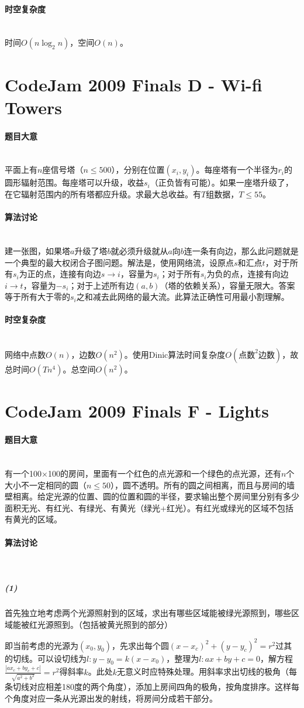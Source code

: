 \documentclass[UTF8]{ctexart}
\newcommand{\myparagraph}[1]{\paragraph{#1}\mbox{}\\}
\theoremstyle{nonumberplain}
\begin{document}
		\myparagraph{时空复杂度}
		
			时间$O(n\log_2n)$，空间$O(n)$。
	
	\section{CodeJam 2009 Finals D - Wi-fi Towers}
	
		\myparagraph{题目大意}
		
			平面上有$n$座信号塔（$n \leq 500$），分别在位置$(x_i,y_i)$。每座塔有一个半径为$r_i$的圆形辐射范围。每座塔可以升级，收益$s_i$（正负皆有可能）。如果一座塔升级了，在它辐射范围内的所有塔都应升级。求最大总收益。有$T$组数据，$T \leq 55$。
		
		\myparagraph{算法讨论}
		
			建一张图，如果塔$a$升级了塔$b$就必须升级就从$a$向$b$连一条有向边，那么此问题就是一个典型的最大权闭合子图问题。解法是，使用网络流，设原点$s$和汇点$t$，对于所有$s_i$为正的点，连接有向边$s \to i$，容量为$s_i$；对于所有$s_i$为负的点，连接有向边$i \to t$，容量为$-s_i$；对于上述所有边$(a,b)$（塔的依赖关系），容量无限大。答案等于所有大于零的$s_i$之和减去此网络的最大流。此算法正确性可用最小割理解。
		
		\myparagraph{时空复杂度}
		
			网络中点数$O(n)$，边数$O(n^2)$。使用Dinic算法时间复杂度$O(\mbox{点数}^2\mbox{边数})$，故总时间$O(Tn^4)$。总空间$O(n^2)$。
	
	\section{CodeJam 2009 Finals F - Lights}
	
		\myparagraph{题目大意}
		
			有一个100×100的房间，里面有一个红色的点光源和一个绿色的点光源，还有$n$个大小不一定相同的圆（$n \leq 50$），圆不透明。所有的圆之间相离，而且与房间的墙壁相离。给定光源的位置、圆的位置和圆的半径，要求输出整个房间里分别有多少面积无光、有红光、有绿光、有黄光（绿光+红光）。有红光或绿光的区域不包括有黄光的区域。
		
		\myparagraph{算法讨论}
		
			\subparagraph{(1)}
			首先独立地考虑两个光源照射到的区域，求出有哪些区域能被绿光源照到，哪些区域能被红光源照到。（包括被黄光照到的部分）
			
			即当前考虑的光源为$(x_0,y_0)$，先求出每个圆$(x-x_c)^2+(y-y_c)^2=r^2$过其的切线。可以设切线为$l:y-y_0=k(x-x_0)$，整理为$l:ax+by+c=0$，解方程$\frac{|ax_c+by_c+c|}{\sqrt{a^2+b^2}}=r^2$得斜率$k$。此处$k$无意义时应特殊处理。用斜率求出切线的极角（每条切线对应相差180度的两个角度），添加上房间四角的极角，按角度排序。这样每个角度对应一条从光源出发的射线，将房间分成若干部分。
			
\end{document}

